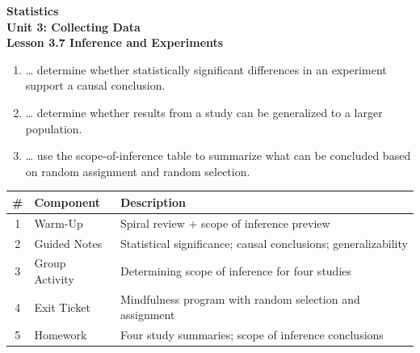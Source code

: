 \documentclass[10pt]{article}
\begin{document}
\vspace{-0.8in}

\begin{center}
  {\color{white}\textbf{\LARGE Statistics}}\\[4pt]
  {\color{skymid}\large\textbf{Unit 3: Collecting Data}}\\[6pt]
  {\color{white}\textbf{\large Lesson 3.7 \quad Inference and Experiments}}
\end{center}

\vspace{0.22in}
\namedateperiod
\vspace{0.18in}

\begin{learningtargetbox}
\small
\begin{enumerate}[leftmargin=1.5em, itemsep=5pt]
  \item \ldots{} determine whether statistically significant differences in an experiment support a causal conclusion.
  \item \ldots{} determine whether results from a study can be generalized to a larger population.
  \item \ldots{} use the scope-of-inference table to summarize what can be concluded based on random assignment and random selection.
\end{enumerate}
\end{learningtargetbox}

\vspace{0.14in}

\begin{tocbox}
\small
\renewcommand{\arraystretch}{1.5}
\begin{tabularx}{\linewidth}{@{} c l X @{}}
\rowcolor{sky}
\textbf{\#} & \textbf{Component} & \textbf{Description} \\
\midrule
1 & Warm-Up & Spiral review + scope of inference preview \\
2 & Guided Notes & Statistical significance; causal conclusions; generalizability \\
3 & Group Activity & Determining scope of inference for four studies \\
4 & Exit Ticket & Mindfulness program with random selection and assignment \\
5 & Homework & Four study summaries; scope of inference conclusions \\
\end{tabularx}
\end{tocbox}
\end{document}
